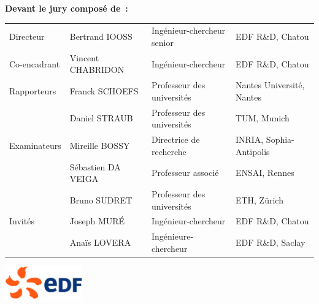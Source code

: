 {\begin{adjustwidth}{-8mm}{-8mm}
\noindent
\textbf{Devant le jury composé de~:}\\
\begin{tabular}{llll}
  Directeur       & Bertrand IOOSS      & Ingénieur-chercheur senior & EDF R\&D, Chatou \\
  Co-encadrant    & Vincent CHABRIDON   & Ingénieur-chercheur        & EDF R\&D, Chatou \\
  Rapporteurs     & Franck SCHOEFS      & Professeur des universités & Nantes Université, Nantes\\
                  & Daniel STRAUB       & Professeur des universités & TUM, Munich\\
  Examinateurs    & Mireille BOSSY      & Directrice de recherche    & INRIA, Sophia-Antipolis\\
                  & Sébastien DA VEIGA  & Professeur associé         & ENSAI, Rennes\\
                  & Bruno SUDRET        & Professeur des universités & ETH, Z\"urich \\ 
  Invités         & Joseph MUR\'E       & Ingénieur-chercheur        & EDF R\&D, Chatou \\
                  & Ana\"is LOVERA      & Ingénieure-chercheur       & EDF R\&D, Saclay\\
\end{tabular}
\end{adjustwidth}

\vfill
\begin{center}
  \includegraphics[width=0.25\textwidth]{classes/logo_EDF.png}
\end{center}
}